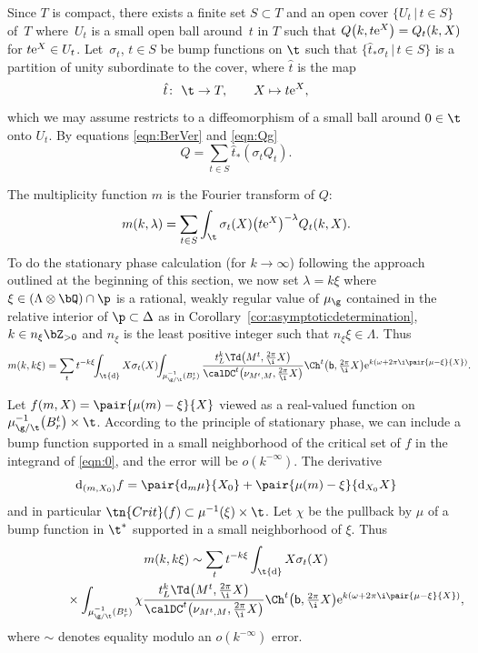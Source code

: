 Since $T$ is compact, there exists a finite set $S \subset T$ and an open cover $\{U_t\,|\,t \in S\}$ of~$T$ where~$U_t$ is a small open ball around~$t$ in $T$ such that $Q\big(k,t{\rm e}^X\big)=Q_t(k,X)$ for $t{\rm e}^X \in U_t$. Let~$\sigma_t$, $t \in S$ be bump functions on $\t$ such that $\{\hat{t}_\ast \sigma_t\,|\,t \in S\}$ is a partition of unity subordinate to the cover, where $\hat{t}$ is the map
\[ \hat{t}\colon \ \t \rightarrow T, \qquad X \mapsto t{\rm e}^X,\]
which we may assume restricts to a diffeomorphism of a small ball around $0 \in \t$ onto $U_t$. By equations \eqref{eqn:BerVer} and \eqref{eqn:Qg}
\[ Q=\sum_{t \in S} \hat{t}_\ast (\sigma_t Q_t). \]

The multiplicity function $m$ is the Fourier transform of $Q$:
\[ m(k,\lambda)=\sum_{t\in S} \int_{\t} \sigma_t(X)\big(t{\rm e}^X\big)^{-\lambda}Q_t(k,X).\]
To do the stationary phase calculation (for $k \rightarrow \infty$) following the approach outlined at the beginning of this section, we now set $\lambda=k\xi$ where $\xi \in (\Lambda \otimes \bQ)\cap \p$ is a rational, weakly regular value of $\mu_\g$ contained in the relative interior of $\p \subset \Delta$ as in Corollary~\ref{cor:asymptoticdetermination}, $k \in n_\xi\bZ_{>0}$ and $n_\xi$ is the least positive integer such that $n_\xi\xi \in \Lambda$. Thus
\begin{gather}\label{eqn:0}
m(k,k\xi)=\sum_t t^{-k\xi}\!\!\int_\t {\rm d} X \sigma_t(X)\!\! \int_{\mu_{\g/\t}^{-1}(B_r^t)} \frac{t_L^k\Td\big(M^t,\tfrac{2\pi}{\i}X\big)}{\calDC^t\big(\nu_{M^t,M},\tfrac{2\pi}{\i}X\big)}\Ch^t\big({\sf b},\tfrac{2\pi}{\i}X\big){\rm e}^{k(\omega+2\pi \i\pair{\mu-\xi}{X})}.\!\!\!\!
\end{gather}

Let $f(m,X)=\pair{\mu(m)-\xi}{X}$ viewed as a real-valued function on $\mu_{\g/\t}^{-1}\big(B_r^t\big) \times \t$. According to the principle of stationary phase, we can include a bump function supported in a small neighborhood of the critical set of $f$ in the integrand of \eqref{eqn:0}, and the error will be $o(k^{-\infty})$. The derivative
\[ {\rm d}_{(m,X_0)}f=\pair{{\rm d}_m\mu}{X_0}+\pair{\mu(m)-\xi}{{\rm d}_{X_0}X}\]
and in particular $\tn{Crit}(f)\subset \mu^{-1}(\xi)\times \t$. Let $\chi$ be the pullback by $\mu$ of a bump function in $\t^\ast$ supported in a small neighborhood of $\xi$. Thus{\samepage
\begin{gather}
m(k,k\xi)\sim \sum_t t^{-k\xi} \int_\t {\rm d}X \sigma_t(X)\nonumber\\
\hphantom{m(k,k\xi)\sim}{}\times \int_{\mu_{\g/\t}^{-1}(B_r^t)}\chi \frac{t_L^k \Td\big(M^t,\tfrac{2\pi}{\i}X\big)}{\calDC^t\big(\nu_{M^t,M},\tfrac{2\pi}{\i}X\big)}\Ch^t\big({\sf b},\tfrac{2\pi}{\i}X\big){\rm e}^{k(\omega+2\pi \i\pair{\mu-\xi}{X})},\label{eqn:1}
\end{gather}
where $\sim$ denotes equality modulo an $o(k^{-\infty})$ error.}

